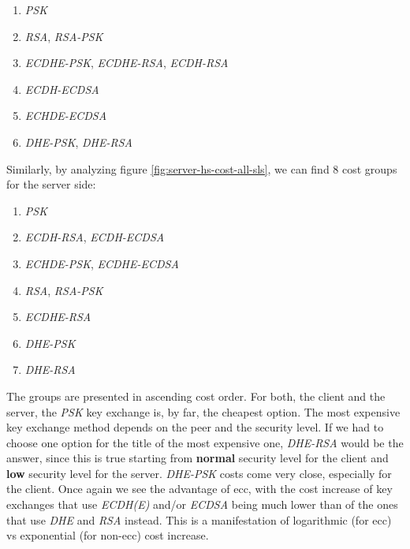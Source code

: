 \documentclass{llncs}
\begin{document}
\begin{enumerate}
  \item \textit{PSK}
  \item \textit{RSA}, \textit{RSA-PSK}
  \item \textit{ECDHE-PSK}, \textit{ECDHE-RSA}, \textit{ECDH-RSA}
  \item \textit{ECDH-ECDSA}
  \item \textit{ECHDE-ECDSA}
  \item \textit{DHE-PSK}, \textit{DHE-RSA}
\end{enumerate}

Similarly, by analyzing figure \ref{fig:server-hs-cost-all-sls}, we can find $8$ cost groups for the server side:

\begin{enumerate}
  \item \textit{PSK}
  \item \textit{ECDH-RSA}, \textit{ECDH-ECDSA}
  \item \textit{ECHDE-PSK}, \textit{ECDHE-ECDSA}
  \item \textit{RSA}, \textit{RSA-PSK}
  \item \textit{ECDHE-RSA}
  \item \textit{DHE-PSK}
  \item \textit{DHE-RSA}
\end{enumerate}

The groups are presented in ascending cost order. For both, the client and the server, the \textit{PSK} key exchange is, by far,
the cheapest option. The most expensive key exchange method depends on the peer and the security level. If we had to choose one
option for the title of the most expensive one, \textit{DHE-RSA} would be the answer, since this is true starting from
\textbf{normal} security level for the client and \textbf{low} security level for the server. \textit{DHE-PSK} costs come very close, 
especially for the client. Once again we see the advantage of \gls{ecc}, with the cost increase of
key exchanges that use \textit{ECDH(E)} and/or \textit{ECDSA} being much lower than of the ones that use \textit{DHE} and \textit{RSA}
instead. This is a manifestation of logarithmic (for \gls{ecc}) vs exponential (for non-\gls{ecc}) cost increase.
\end{document}
